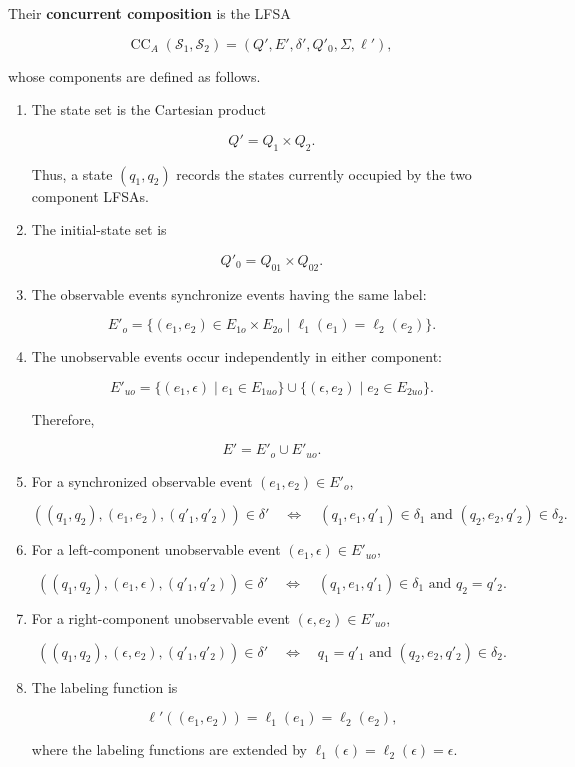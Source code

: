 \documentclass[11pt]{article}
\begin{document}
Their \textbf{concurrent composition} is the LFSA

\[
\operatorname{CC}_{A}(\mathcal S_1,\mathcal S_2)
=(Q',E',\delta',Q'_0,\Sigma,\ell'),
\]

whose components are defined as follows.

\begin{enumerate}
\item The state set is the Cartesian product

\[
   Q'=Q_1\times Q_2.
\]

Thus, a state $(q_1,q_2)$ records the states currently occupied by the two component LFSAs.

\item The initial-state set is

\[
   Q'_0=Q_{01}\times Q_{02}.
\]

\item The observable events synchronize events having the same label:

\[
   E'_o
   =\{(e_1,e_2)\in E_{1o}\times E_{2o}
   \mid\ell_1(e_1)=\ell_2(e_2)\}.
\]

\item The unobservable events occur independently in either component:

\[
   E'_{uo}
   =\{(e_1,\epsilon)\mid e_1\in E_{1uo}\}
   \cup
   \{(\epsilon,e_2)\mid e_2\in E_{2uo}\}.
\]

Therefore,

\[
   E'=E'_o\cup E'_{uo}.
\]

\item For a synchronized observable event $(e_1,e_2)\in E'_o$,

\[
   ((q_1,q_2),(e_1,e_2),(q'_1,q'_2))\in\delta'
   \quad\Longleftrightarrow\quad
   (q_1,e_1,q'_1)\in\delta_1
   \text{ and }
   (q_2,e_2,q'_2)\in\delta_2.
\]

\item For a left-component unobservable event $(e_1,\epsilon)\in E'_{uo}$,

\[
   ((q_1,q_2),(e_1,\epsilon),(q'_1,q'_2))\in\delta'
   \quad\Longleftrightarrow\quad
   (q_1,e_1,q'_1)\in\delta_1
   \text{ and }
   q_2=q'_2.
\]

\item For a right-component unobservable event $(\epsilon,e_2)\in E'_{uo}$,

\[
   ((q_1,q_2),(\epsilon,e_2),(q'_1,q'_2))\in\delta'
   \quad\Longleftrightarrow\quad
   q_1=q'_1
   \text{ and }
   (q_2,e_2,q'_2)\in\delta_2.
\]

\item The labeling function is

\[
   \ell'((e_1,e_2))
   =\ell_1(e_1)
   =\ell_2(e_2),
\]

where the labeling functions are extended by $\ell_1(\epsilon)=\ell_2(\epsilon)=\epsilon$.

\end{enumerate}
\end{document}
